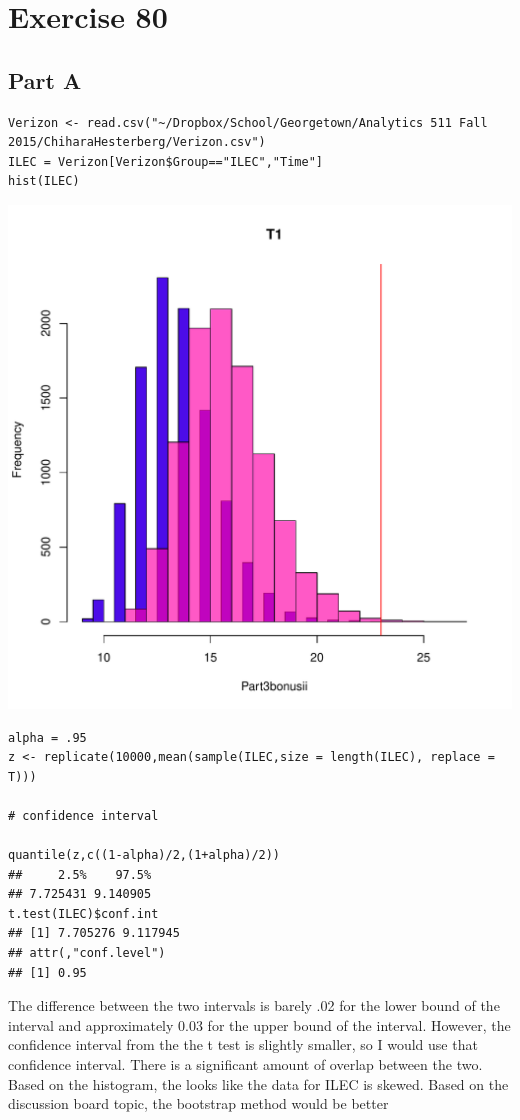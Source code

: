 \documentclass{article}\usepackage[]{graphicx}\usepackage[]{color}
\makeatletter
\newenvironment{kframe}{%
 \def\at@end@of@kframe{}%
 \ifinner\ifhmode%
  \def\at@end@of@kframe{\end{minipage}}%
  \begin{minipage}{\columnwidth}%
 \fi\fi%
 \def\FrameCommand##1{\hskip\@totalleftmargin \hskip-\fboxsep
 \colorbox{shadecolor}{##1}\hskip-\fboxsep
     \hskip-\linewidth \hskip-\@totalleftmargin \hskip\columnwidth}%
 \MakeFramed {\advance\hsize-\width
   \@totalleftmargin\z@ \linewidth\hsize
   \@setminipage}}%
 {\par\unskip\endMakeFramed%
 \at@end@of@kframe}
\newenvironment{knitrout}{}{} %
\makeatother
\begin{document}
\section*{Exercise 80}
\subsection*{Part A}
\begin{knitrout}
\color{fgcolor}\begin{kframe}
\begin{verbatim}
Verizon <- read.csv("~/Dropbox/School/Georgetown/Analytics 511 Fall 2015/ChiharaHesterberg/Verizon.csv")
ILEC = Verizon[Verizon$Group=="ILEC","Time"]
hist(ILEC)
\end{verbatim}
\end{kframe}
\includegraphics[width=0.33\linewidth]{figure/unnamed-chunk-11-1} 
\begin{kframe}\begin{verbatim}
alpha = .95
z <- replicate(10000,mean(sample(ILEC,size = length(ILEC), replace = T)))

# confidence interval

quantile(z,c((1-alpha)/2,(1+alpha)/2))
##     2.5%    97.5% 
## 7.725431 9.140905
t.test(ILEC)$conf.int
## [1] 7.705276 9.117945
## attr(,"conf.level")
## [1] 0.95
\end{verbatim}
\end{kframe}
\end{knitrout}
The difference between the two intervals is barely .02 for the lower bound of the interval and approximately 0.03 for the upper bound of the interval. However, the confidence interval from the the t test is slightly smaller, so I would use that confidence interval. There is a significant amount of overlap between the two. Based on the histogram, the looks like the data for ILEC is skewed. Based on the discussion board topic, the bootstrap method would be better
\end{document}
